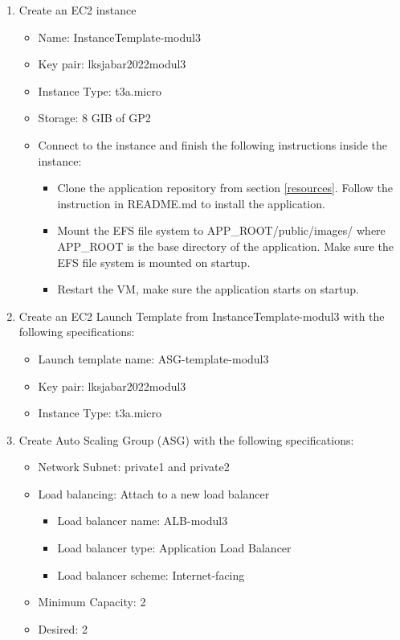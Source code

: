 \documentclass{article}
\begin{document}
\begin{enumerate}
  \item Create an EC2 instance
  \begin{itemize}
    \item Name: InstanceTemplate-modul3
    \item Key pair: lksjabar2022modul3
    \item Instance Type: t3a.micro
    \item Storage: 8 GIB of GP2
    \item Connect to the instance and finish the following instructions inside the instance:
    \begin{itemize}
        \item Clone the application repository from section \ref{resources}. Follow the instruction in README.md to install the application.
        \item Mount the EFS file system to APP\_ROOT/public/images/ where APP\_ROOT is the base directory of the application. Make sure the EFS file system is mounted on startup.
        \item Restart the VM, make sure the application starts on startup.
    \end{itemize}
  \end{itemize}
  \item Create an EC2 Launch Template from InstanceTemplate-modul3 with the following specifications:
  \begin{itemize}
    \item Launch template name: ASG-template-modul3
    \item Key pair: lksjabar2022modul3
    \item Instance Type: t3a.micro
  \end{itemize}
  \item Create Auto Scaling Group (ASG) with the following specifications:
  \begin{itemize}
    \item Network Subnet: private1 and private2
    \item Load balancing: Attach to a new load balancer
    \begin{itemize}
        \item Load balancer name: ALB-modul3
        \item Load balancer type: Application Load Balancer
        \item Load balancer scheme: Internet-facing
    \end{itemize}
    \item Minimum Capacity: 2
    \item Desired: 2

\end{itemize}
\end{enumerate}
\end{document}
